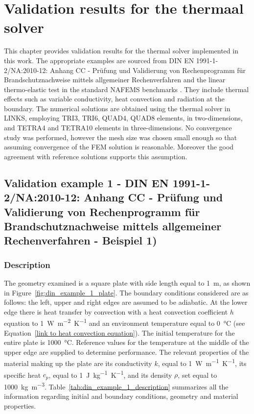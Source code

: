 \chapter{Validation results for the thermaal solver}

This chapter provides validation results for the thermal solver implemented in this work.
The appropriate examples are sourced from DIN EN 1991-1-2/NA:2010-12: Anhang CC - Prüfung und  Validierung von Rechenprogramm für Brand\-schutz\-nach\-weise mittels allgemeiner Rechenverfahren \cite{} and the linear thermo-elastic test in the standard NAFEMS benchmarks \cite{}.
They include thermal effects such as variable conductivity, heat convection and radiation at the boundary.
The numerical solutions are obtained using the thermal solver in LINKS, employing TRI3, TRI6, QUAD4, QUAD8 elements, in two-dimensions, and TETRA4 and TETRA10 elements in three-dimensions.
No convergence study was performed, however the mesh size was chosen small enough so that assuming convergence of the FEM solution is reasonable.
Moreover the good agreement with reference solutions supports this assumption.

\section{Validation example 1 - DIN EN 1991-1-2/NA:2010-12: Anhang CC - Prüfung und Validierung von Rechenprogramm für Brandschutznachweise mittels allgemeiner Rechenverfahren - Beispiel 1)}

\subsection{Description}

The geometry examined is a square plate with side length equal to \SI{1}{\meter}, as shown in Figure~\ref{fig:din_example_1_plate}.
The boundary conditions considered are as follows: the left, upper and right edges are assumed to be adiabatic.
At the lower edge there is heat transfer by convection with a heat convection coefficient \(h\) equation to \SI{1}{\watt\meter^{-2}\kelvin^{-1}} and an environment temperature equal to \SI{0}{\celsius} (see Equation~\ref{link to heat convection equation}).
The initial temperature for the entire plate is \SI{1000}{\celsius}.
Reference values for the temperature at the middle of the upper edge are supplied to determine performance.
The relevant properties of the material making up the plate are its conductivity \(k\), equal to \SI{1}{\watt\meter^{-1}\kelvin^{-1}}, its specific heat \(c_p\), equal to \SI{1}{\joule\kilo\gram^{-1}\kelvin^{-1}}, and its density \(\rho\), set equal to \SI{1000}{\kilo\gram\meter^{-3}}.
Table~\ref{tab:din_example_1_description} summarizes all the information regarding initial and boundary conditions, geometry and material properties.

